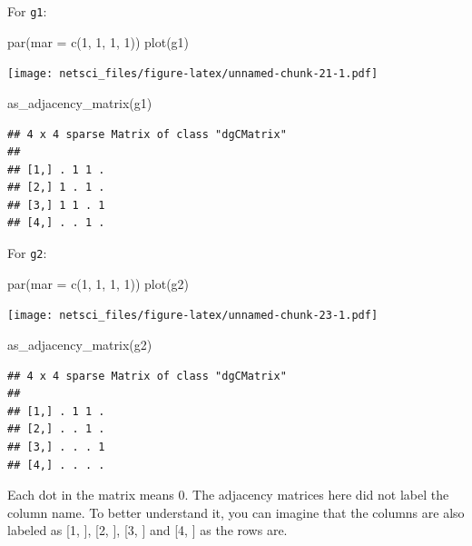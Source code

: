 \documentclass[
]{krantz}
\makeatletter
\newenvironment{Shaded}{\begin{snugshade}}{\end{snugshade}}
\newcommand{\AttributeTok}[1]{\textcolor[rgb]{0.61,0.61,0.61}{#1}}
\newcommand{\DecValTok}[1]{\textcolor[rgb]{0.06,0.06,0.06}{#1}}
\newcommand{\FunctionTok}[1]{\textcolor[rgb]{0,0,0}{#1}}
\newcommand{\NormalTok}[1]{#1}
\newenvironment{kframe}{%
\medskip{}
\setlength{\fboxsep}{.8em}
 \def\at@end@of@kframe{}%
 \ifinner\ifhmode%
  \def\at@end@of@kframe{\end{minipage}}%
  \begin{minipage}{\columnwidth}%
 \fi\fi%
 \def\FrameCommand##1{\hskip\@totalleftmargin \hskip-\fboxsep
 \colorbox{shadecolor}{##1}\hskip-\fboxsep
     \hskip-\linewidth \hskip-\@totalleftmargin \hskip\columnwidth}%
 \MakeFramed {\advance\hsize-\width
   \@totalleftmargin\z@ \linewidth\hsize
   \@setminipage}}%
 {\par\unskip\endMakeFramed%
 \at@end@of@kframe}
\renewenvironment{Shaded}{\begin{kframe}}{\end{kframe}}
\makeatother
\begin{document}
For \texttt{g1}:

\begin{Shaded}
\begin{Highlighting}[]
\FunctionTok{par}\NormalTok{(}\AttributeTok{mar =} \FunctionTok{c}\NormalTok{(}\DecValTok{1}\NormalTok{, }\DecValTok{1}\NormalTok{, }\DecValTok{1}\NormalTok{, }\DecValTok{1}\NormalTok{))}
\FunctionTok{plot}\NormalTok{(g1)}
\end{Highlighting}
\end{Shaded}

\texttt{[image: netsci\_files/figure-latex/unnamed-chunk-21-1.pdf]}

\begin{Shaded}
\begin{Highlighting}[]
\FunctionTok{as\_adjacency\_matrix}\NormalTok{(g1)}
\end{Highlighting}
\end{Shaded}

\begin{verbatim}
## 4 x 4 sparse Matrix of class "dgCMatrix"
##             
## [1,] . 1 1 .
## [2,] 1 . 1 .
## [3,] 1 1 . 1
## [4,] . . 1 .
\end{verbatim}

For \texttt{g2}:

\begin{Shaded}
\begin{Highlighting}[]
\FunctionTok{par}\NormalTok{(}\AttributeTok{mar =} \FunctionTok{c}\NormalTok{(}\DecValTok{1}\NormalTok{, }\DecValTok{1}\NormalTok{, }\DecValTok{1}\NormalTok{, }\DecValTok{1}\NormalTok{))}
\FunctionTok{plot}\NormalTok{(g2)}
\end{Highlighting}
\end{Shaded}

\texttt{[image: netsci\_files/figure-latex/unnamed-chunk-23-1.pdf]}

\begin{Shaded}
\begin{Highlighting}[]
\FunctionTok{as\_adjacency\_matrix}\NormalTok{(g2)}
\end{Highlighting}
\end{Shaded}

\begin{verbatim}
## 4 x 4 sparse Matrix of class "dgCMatrix"
##             
## [1,] . 1 1 .
## [2,] . . 1 .
## [3,] . . . 1
## [4,] . . . .
\end{verbatim}

Each dot in the matrix means \(0\). The adjacency matrices here did not label the column name. To better understand it, you can imagine that the columns are also labeled as {[}1, {]}, {[}2, {]}, {[}3, {]} and {[}4, {]} as the rows are.
\end{document}
